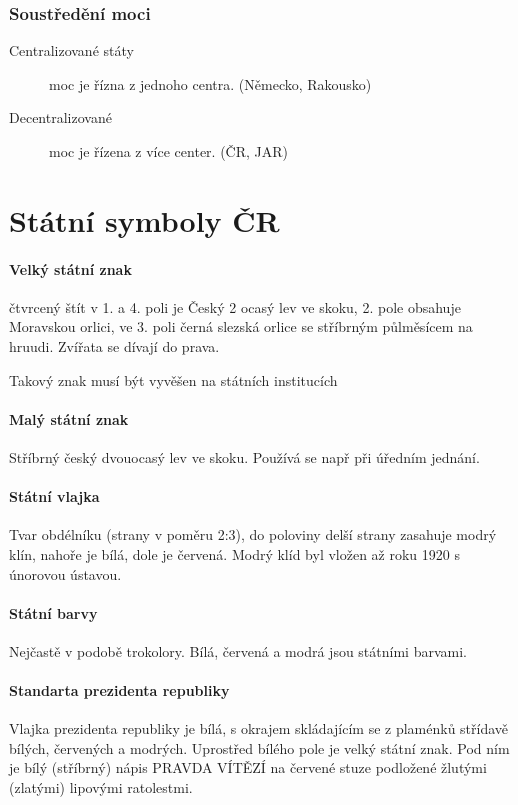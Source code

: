 \documentclass[10pt,a4paper,
twoside,%
]{report}
\begin{document}
\subsubsection{Soustředění moci}
\begin{description}
\item[Centralizované státy] moc je řízna z jednoho centra. (Německo, Rakousko)

\item[Decentralizované] moc je řízena z více center. (ČR, JAR)

\end{description}


\section{Státní symboly ČR}

\paragraph{Velký státní znak}
čtvrcený štít v 1. a 4. poli je Český 2 ocasý lev ve skoku, 2. pole obsahuje Moravskou orlici, ve 3. poli černá slezská orlice se stříbrným půlměsícem na hruudi. Zvířata se dívají do prava.

Takový znak musí být vyvěšen na státních institucích

\paragraph{Malý státní znak} Stříbrný český dvouocasý lev ve skoku. Používá se např při úředním jednání.

\paragraph{Státní vlajka} Tvar obdélníku (strany v poměru 2:3), do poloviny delší strany zasahuje modrý klín, nahoře je bílá, dole je červená. Modrý klíd byl vložen až roku 1920 s únorovou ústavou.

\paragraph{Státní barvy} Nejčastě v podobě trokolory. Bílá, červená a modrá jsou státními barvami.

\paragraph{Standarta prezidenta republiky} Vlajka prezidenta republiky je bílá, s okrajem skládajícím se z plaménků střídavě bílých, červených a modrých. Uprostřed bílého pole je velký státní znak. Pod ním je bílý (stříbrný) nápis PRAVDA VÍTĚZÍ na červené stuze podložené žlutými (zlatými) lipovými ratolestmi.
\end{document}
